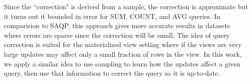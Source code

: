 Since the ``correction" is derived from a sample, the correction is approximate but it turns out it bounded in error for SUM, COUNT, and AVG queries.
In comparision to SAQP, this approach gives more accurate results in datasets where errors are sparse since the correction will be small.
The idea of query correction is suited for the materialized view setting where if the views are very large updates may affect only a small fraction of rows in the view.
In this work, we apply a similar idea to use sampling to learn how the updates affect a given query, then use that information to correct the query so it is up-to-date.


